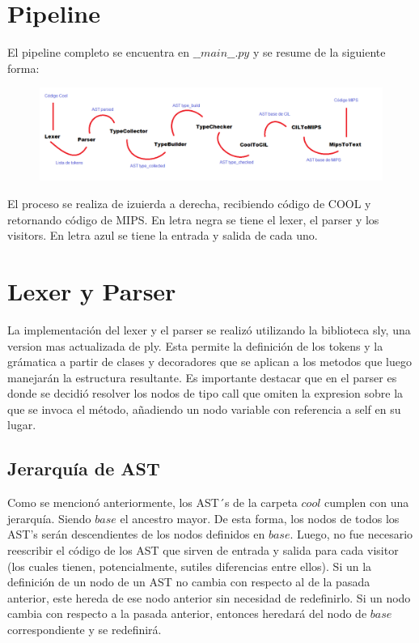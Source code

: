 \documentclass[a4paper,12pt]{article}
\begin{document}
\section*{Pipeline}

El pipeline completo se encuentra en $\_\_main\_\_.py$ y se resume de la siguiente forma:\\

\begin{figure}[H]
\centering
\includegraphics[width=0.9\linewidth]{./4}
\caption{}
\label{fig:4}
\end{figure}

El proceso se realiza de izuierda a derecha, recibiendo código de COOL y retornando código de MIPS. En letra negra se tiene el lexer, el parser y los visitors. En letra azul se tiene la entrada y salida de cada uno.

\section*{Lexer y Parser}
La implementación del lexer y el parser se realizó utilizando la biblioteca sly, una version mas actualizada de ply. Esta permite la definición de los tokens y la grámatica a partir de clases y decoradores que se aplican a los metodos que luego manejarán la estructura resultante. Es importante destacar que en el parser es donde se decidió resolver los nodos de tipo call que omiten la expresion sobre la que se invoca el método, añadiendo un nodo variable con referencia a self en su lugar.

\subsection*{Jerarquía de AST}
Como se mencionó anteriormente, los AST´s de la carpeta $cool$ cumplen con una jerarquía. Siendo $base$ el ancestro mayor. De esta forma, los nodos de todos los AST's serán descendientes de los nodos definidos en $base$. Luego, no fue necesario reescribir el código de los AST que sirven de entrada y salida para cada visitor (los cuales tienen, potencialmente, sutiles diferencias entre ellos). Si un la definición de un nodo de un AST no cambia con respecto al de la pasada anterior, este hereda de ese nodo anterior sin necesidad de redefinirlo. Si un nodo cambia con respecto a la pasada anterior, entonces heredará del nodo de $base$ correspondiente y se redefinirá.\\
\end{document}
